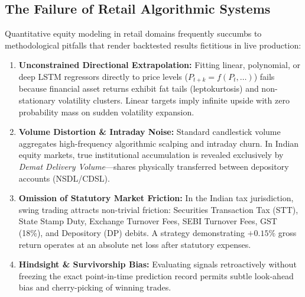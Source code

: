 \documentclass[11pt,a4paper]{article}
\begin{document}
\subsection{The Failure of Retail Algorithmic Systems}
Quantitative equity modeling in retail domains frequently succumbs to methodological pitfalls that render backtested results fictitious in live production:
\begin{enumerate}[leftmargin=*]
    \item \textbf{Unconstrained Directional Extrapolation:} Fitting linear, polynomial, or deep LSTM regressors directly to price levels ($P_{t+k} = f(P_t, \dots)$) fails because financial asset returns exhibit fat tails (leptokurtosis) and non-stationary volatility clusters. Linear targets imply infinite upside with zero probability mass on sudden volatility expansion.
    \item \textbf{Volume Distortion \& Intraday Noise:} Standard candlestick volume aggregates high-frequency algorithmic scalping and intraday churn. In Indian equity markets, true institutional accumulation is revealed exclusively by \textit{Demat Delivery Volume}---shares physically transferred between depository accounts (NSDL/CDSL).
    \item \textbf{Omission of Statutory Market Friction:} In the Indian tax jurisdiction, swing trading attracts non-trivial friction: Securities Transaction Tax (STT), State Stamp Duty, Exchange Turnover Fees, SEBI Turnover Fees, GST (18\%), and Depository (DP) debits. A strategy demonstrating $+0.15\%$ gross return operates at an absolute net loss after statutory expenses.
    \item \textbf{Hindsight \& Survivorship Bias:} Evaluating signals retroactively without freezing the exact point-in-time prediction record permits subtle look-ahead bias and cherry-picking of winning trades.
\end{enumerate}
\end{document}

